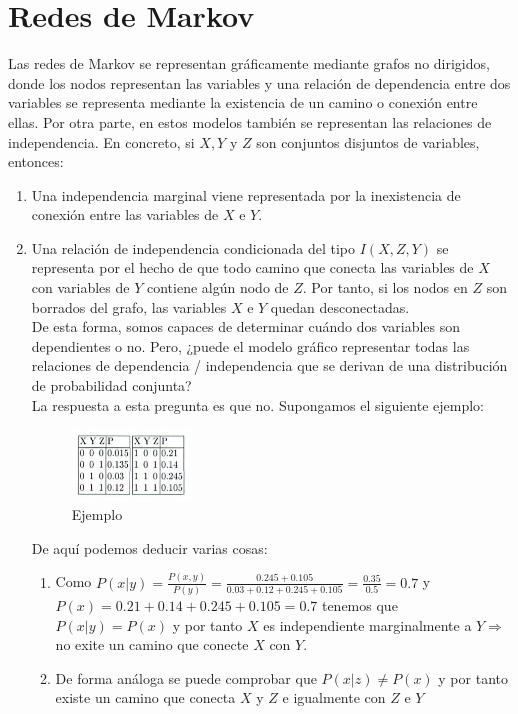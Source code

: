\documentclass{article}
\theoremstyle{definition_wo_parentheses}
\begin{document}
\section{Redes de Markov}
Las redes de Markov se representan gráficamente mediante grafos no dirigidos, donde los nodos representan las variables y una relación de dependencia entre dos variables se representa mediante la existencia de un camino o conexión entre ellas. Por otra parte, en estos modelos también se representan las relaciones de independencia. En concreto, si $X,Y$ y $Z$ son conjuntos disjuntos de variables, entonces:
\begin{enumerate}
\item Una independencia marginal viene representada por la inexistencia de conexión entre las variables de $X$ e $Y$.
\item Una relación de independencia condicionada del tipo $I(X,Z,Y)$ se representa por el hecho de que todo camino que conecta las variables de $X$ con variables de $Y$ contiene algún nodo de $Z$. Por tanto, si los nodos en $Z$ son borrados del grafo, las variables $X$ e $Y$ quedan desconectadas.\\
De esta forma, somos capaces de determinar cuándo dos variables son dependientes o no. Pero, ¿puede el modelo gráfico representar todas las relaciones de dependencia / independencia que se derivan de una distribución de probabilidad conjunta?\\
La respuesta a esta pregunta es que no. Supongamos el siguiente ejemplo:

\begin{figure}[H]
\centering
\includegraphics[width=0.3\textwidth]{ejemplo}
\caption{Ejemplo} \label{fig:ejemplo}
\end{figure}

De aquí podemos deducir varias cosas:
\begin{enumerate}
\item Como $P(x|y)=\frac{P(x,y)}{P(y)} = \frac{0.245+0.105}{0.03+0.12+0.245+0.105} = \frac{0.35}{0.5} = 0.7$ y $P(x)=0.21+0.14+0.245+0.105 = 0.7$ tenemos que $P(x|y)=P(x)$ y por tanto $X$ es independiente marginalmente a $Y \Rightarrow$ no exite un camino que conecte $X$ con $Y$.
\item De forma análoga se puede comprobar que $P(x|z)\neq P(x)$ y por tanto existe un camino que conecta $X$ y $Z$ e igualmente con $Z$ e $Y$
\end{enumerate}


\end{enumerate}
\end{document}
